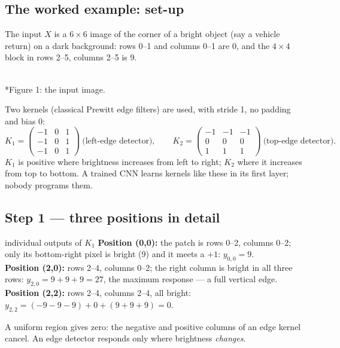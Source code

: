 \documentclass[11pt]{article}
\newcommand{\pcell}[3]{\pgfmathsetmacro{\shade}{int(100-#3*100/9)}\fill[black!\shade!white](#1,#2)rectangle++(1,1);\draw[GreyN!60,line width=0.3pt](#1,#2)rectangle++(1,1);\node[font=\footnotesize,text=\ifnum#3>4 NavyN\else white\fi]at(#1+0.5,#2+0.5){#3};}
\begin{document}
\subsection{The worked example: set-up}
The input $X$ is a $6\times6$ image of the corner of a bright object (say a vehicle return) on a dark background: rows 0--1 and columns 0--1 are 0, and the $4\times4$ block in rows 2--5, columns 2--5 is 9.
\begin{center}\\*{\small\color{GreyN}Figure 1: the input image.}\end{center}
Two kernels (classical Prewitt edge filters) are used, with stride 1, no padding and bias 0:
\[K_1=\begin{pmatrix}-1&0&1\\-1&0&1\\-1&0&1\end{pmatrix}\ \text{(left-edge detector)},\qquad K_2=\begin{pmatrix}-1&-1&-1\\0&0&0\\1&1&1\end{pmatrix}\ \text{(top-edge detector)}.\]
$K_1$ is positive where brightness increases from left to right; $K_2$ where it increases from top to bottom. A trained CNN learns kernels like these in its first layer; nobody programs them.

\subsection{Step 1 --- three positions in detail}
\begin{example}{individual outputs of $K_1$}
\textbf{Position (0,0):} the patch is rows 0--2, columns 0--2; only its bottom-right pixel is bright (9) and it meets a $+1$: $y_{0,0}=9$.\\
\textbf{Position (2,0):} rows 2--4, columns 0--2; the right column is bright in all three rows: $y_{2,0}=9+9+9=27$, the maximum response --- a full vertical edge.\\
\textbf{Position (2,2):} rows 2--4, columns 2--4, all bright: $y_{2,2}=(-9-9-9)+0+(9+9+9)=0$.
\end{example}
\begin{keypoint}
A uniform region gives zero: the negative and positive columns of an edge kernel cancel. An edge detector responds only where brightness \emph{changes}.
\end{keypoint}
\end{document}
